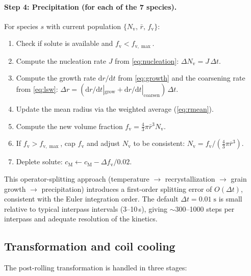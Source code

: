 \documentclass[11pt,a4paper]{article}
\newcommand{\fv}{\ensuremath{f_\mathrm{v}}}
\newcommand{\Nv}{\ensuremath{N_\mathrm{v}}}
\begin{document}
\paragraph{Step 4: Precipitation (for each of the 7 species).}
For species $s$ with current population $\{\Nv,\,\bar{r},\,\fv\}$:
\begin{enumerate}
  \item Check if solute is available and $\fv < f_{\mathrm{v},\max}$.
  \item Compute the nucleation rate $J$ from \cref{eq:nucleation}:
    $\Delta\Nv = J\,\Delta t$.
  \item Compute the growth rate $\mathrm{d}r/\mathrm{d}t$ from \cref{eq:growth}
    and the coarsening rate from \cref{eq:lsw}:
    $\Delta r = (\mathrm{d}r/\mathrm{d}t|_\mathrm{grow}
    + \mathrm{d}r/\mathrm{d}t|_\mathrm{coarsen})\,\Delta t$.
  \item Update the mean radius via the weighted average (\cref{eq:rmean}).
  \item Compute the new volume fraction $\fv = \frac{4}{3}\pi\bar{r}^3\Nv$.
  \item If $\fv > f_{\mathrm{v},\max}$, cap $\fv$ and adjust $\Nv$ to be
    consistent: $\Nv = \fv / (\frac{4}{3}\pi\bar{r}^3)$.
  \item Deplete solute: $c_\mathrm{M} \leftarrow c_\mathrm{M}
    - \Delta\fv / 0.02$.
\end{enumerate}

\noindent This operator-splitting approach (temperature $\to$ recrystallization
$\to$ grain growth $\to$ precipitation) introduces a first-order splitting
error of $O(\Delta t)$, consistent with the Euler integration order.  The
default $\Delta t = 0.01\;\mathrm{s}$ is small relative to typical interpass
intervals (3--10\,s), giving $\sim$300--1000 steps per interpass and adequate
resolution of the kinetics.

\subsection{Transformation and coil cooling}
\label{sec:impl-transform}

The post-rolling transformation is handled in three stages:
\end{document}
